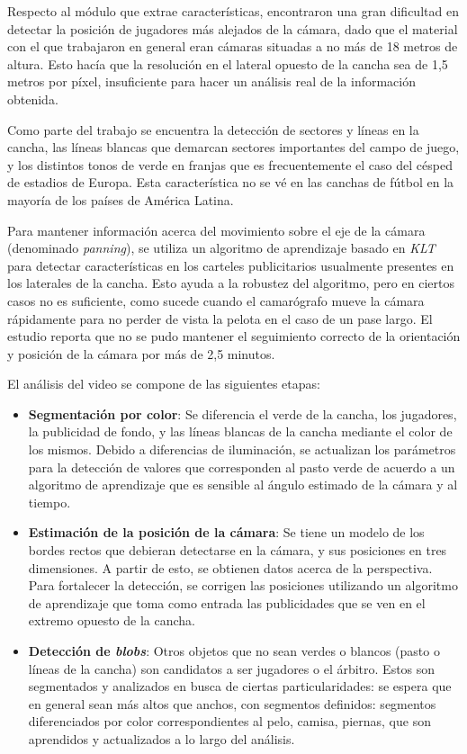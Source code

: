 \documentclass[a4paper,10pt]{article}
\begin{document}
Respecto al módulo que extrae características, encontraron una gran dificultad
en detectar la posición de jugadores más alejados de la cámara, dado que el
material con el que trabajaron en general eran cámaras situadas a no más de 18
metros de altura. Esto hacía que la resolución en el lateral opuesto de la
cancha sea de 1,5 metros por píxel, insuficiente para hacer un análisis real de
la información obtenida.

Como parte del trabajo se encuentra la detección de sectores y líneas en la
cancha, las líneas blancas que demarcan sectores importantes del campo de
juego, y los distintos tonos de verde en franjas que es frecuentemente el caso
del césped de estadios de Europa. Esta característica no se vé en las canchas
de fútbol en la mayoría de los países de América Latina.

Para mantener información acerca del movimiento sobre el eje de la cámara
(denominado \textit{panning}), se utiliza un algoritmo de aprendizaje basado en
\textit{KLT} para detectar características en los carteles publicitarios
usualmente presentes en los laterales de la cancha. Esto ayuda a la robustez
del algoritmo, pero en ciertos casos no es suficiente, como sucede cuando el
camarógrafo mueve la cámara rápidamente para no perder de vista la pelota en el
caso de un pase largo. El estudio reporta que no se pudo mantener el seguimiento
correcto de la orientación y posición de la cámara por más de 2,5 minutos.

El análisis del video se compone de las siguientes etapas:

\begin{itemize}

  \item \textbf{Segmentación por color}: Se diferencia el verde de la cancha,
    los jugadores, la publicidad de fondo, y las líneas blancas de la cancha
    mediante el color de los mismos. Debido a diferencias de iluminación, se
    actualizan los parámetros para la detección de valores que corresponden al
    pasto verde de acuerdo a un algoritmo de aprendizaje que es sensible al
    ángulo estimado de la cámara y al tiempo.

  \item \textbf{Estimación de la posición de la cámara}: Se tiene un modelo de
    los bordes rectos que debieran detectarse en la cámara, y sus posiciones en
    tres dimensiones. A partir de esto, se obtienen datos acerca de la
    perspectiva. Para fortalecer la detección, se corrigen las posiciones
    utilizando un algoritmo de aprendizaje que toma como entrada las
    publicidades que se ven en el extremo opuesto de la cancha.

  \item \textbf{Detección de \textit{blobs}}: Otros objetos que no sean verdes
    o blancos (pasto o líneas de la cancha) son candidatos a ser jugadores o el
    árbitro. Estos son segmentados y analizados en busca de ciertas
    particularidades: se espera que en general sean más altos que anchos, con
    segmentos definidos: segmentos diferenciados por color correspondientes al
    pelo, camisa, piernas, que son aprendidos y actualizados a lo largo del
    análisis.

\end{itemize}
\end{document}
